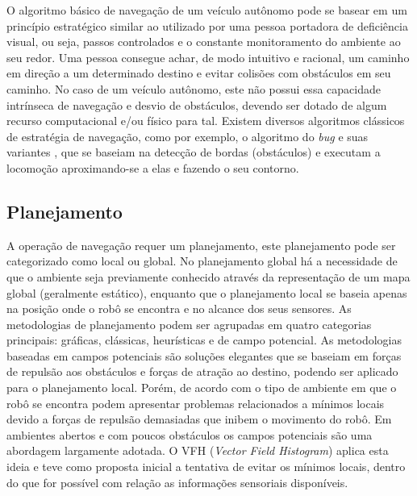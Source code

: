 O algoritmo básico de navegação de um veículo autônomo pode se basear em um
princípio estratégico similar ao utilizado por uma pessoa portadora de
deficiência visual, ou seja, passos controlados e o constante monitoramento do
ambiente ao seu redor. Uma pessoa consegue achar, de modo intuitivo e racional,
um caminho em direção a um determinado destino e evitar colisões com obstáculos
em seu caminho. No caso de um veículo autônomo, este não possui essa capacidade
intrínseca de navegação e desvio de obstáculos, devendo ser dotado de algum
recurso computacional e/ou físico para tal. Existem diversos algoritmos
clássicos de estratégia de navegação, como por exemplo, o algoritmo do
\textit{bug} \cite{Choset2005} e suas variantes \cite{Taylor2009}, que se
baseiam na detecção de bordas (obstáculos) e executam a locomoção aproximando-se
a elas e fazendo o seu contorno.


\subsection{Planejamento}

A operação de navegação requer um planejamento, este planejamento pode ser
categorizado como local ou global. No planejamento global há a necessidade de
que o ambiente seja previamente conhecido através da representação de um mapa
global (geralmente estático), enquanto que o planejamento local se baseia apenas
na posição onde o robô se encontra e no alcance dos seus sensores. As
metodologias de planejamento podem ser agrupadas em quatro categorias
principais: gráficas, clássicas, heurísticas e de campo potencial. As
metodologias baseadas em campos potenciais são soluções elegantes que se baseiam
em forças de repulsão aos obstáculos e forças de atração ao destino, podendo ser
aplicado para o planejamento local. Porém, de acordo com o tipo de ambiente em
que o robô se encontra podem apresentar problemas relacionados a mínimos locais
devido a forças de repulsão demasiadas que inibem o movimento do robô. Em
ambientes abertos e com poucos obstáculos os campos potenciais são uma abordagem
largamente adotada. O VFH (\textit{Vector Field Histogram})
\cite{Borenstein1991} aplica esta ideia e teve como proposta inicial a tentativa
de evitar os mínimos locais, dentro do que for possível com relação as
informações sensoriais disponíveis.



